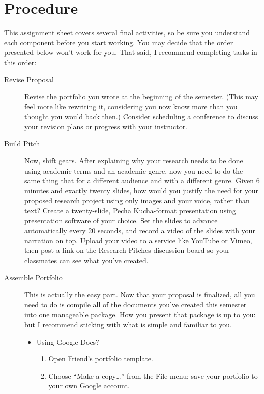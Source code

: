 \documentclass[10pt,oneside]{amsart}	%
\begin{document}
\section{Procedure} %
	\label{sec:procedure}
This assignment sheet covers several final activities, so be sure you understand each component before you start working. You may decide that the order presented below won't work for you. That said, I recommend completing tasks in this order:
\begin{description}
	\item[Revise Proposal] Revise the portfolio you wrote at the beginning of the semester. (This may feel more like rewriting it, considering you now know more than you thought you would back then.) Consider scheduling a conference to discuss your revision plans or progress with your instructor.
	\item[Build Pitch] Now, shift gears. After explaining why your research needs to be done using academic terms and an academic genre, now you need to do the same thing that for a different audience and with a different genre. Given 6\textonehalf{} minutes and exactly twenty slides, how would you justify the need for your proposed research project using only images and your voice, rather than text? Create a twenty-slide, \href{http://www.pechakucha.org/}{Pecha Kucha}-format presentation using presentation software of your choice. Set the slides to advance automatically every 20 seconds, and record a video of the slides with your narration on top. Upload your video to a service like \href{http://www.youtube.com/}{YouTube} or \href{https://vimeo.com/}{Vimeo}, then post a link on the \href{https://webcourses2c.instructure.com/courses/982699/discussion_topics/1903125}{Research Pitches discussion board} so your classmates can see what you've created.
	\item[Assemble Portfolio]  This is actually the easy part. Now that your proposal is finalized, all you need to do is compile all of the documents you've created this semester into one manageable package. How you present that package is up to you: but I recommend sticking with what is simple and familiar to you.
	\begin{itemize}
		\item Using Google Docs?
		\begin{enumerate}
			\item Open Friend's \href{https://docs.google.com/document/d/1iAnB0vb4Jo_ezOEuCqSu1nGX4AfqvYvmD1BSNna1SzM/edit?usp=sharing}{portfolio template}.
			\item Choose ``Make a copy…'' from the File menu; save your portfolio to your own Google account.

\end{enumerate}
\end{itemize}
\end{description}
\end{document}

